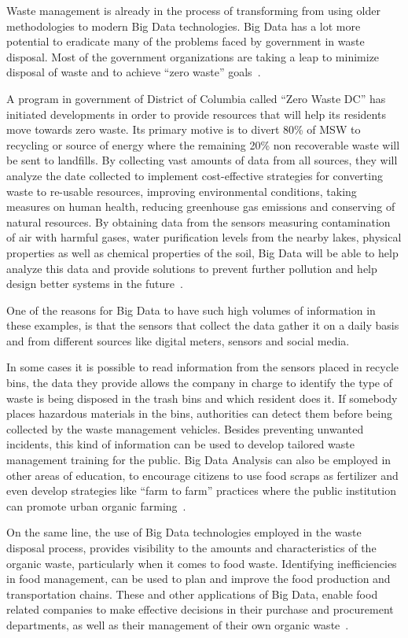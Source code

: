 Waste management is already in the process of transforming from using older 
methodologies to modern Big Data technologies. Big Data has a lot more 
potential to eradicate many of the problems faced by government in waste 
disposal. Most of the government organizations are taking a leap to minimize 
disposal of waste and to achieve ``zero waste'' goals~\cite{rosengren2017}. 

A program in government of District of Columbia called ``Zero Waste DC'' 
has initiated developments in order to provide resources that will help 
its residents move towards zero waste. Its primary motive is to divert 
80\% of MSW to recycling or source of energy where the remaining 20\% 
non recoverable waste will be sent to landfills. By collecting vast amounts 
of data from all sources, they will analyze  the date collected to implement 
cost-effective strategies for converting waste to re-usable resources, 
improving environmental conditions, taking measures on human health, 
reducing greenhouse gas emissions and conserving of natural resources. 
By obtaining data from the sensors measuring contamination of air with 
harmful gases, water purification levels from the nearby lakes, physical 
properties as well as chemical properties of the soil, Big Data will be 
able to help analyze this data and provide solutions to prevent further 
pollution and help design better systems in the future~\cite{rosengren2017}.

One of the reasons for Big Data to have such high volumes of information 
in these examples, is that the sensors that collect the data gather it on 
a daily basis and from different sources like digital meters, sensors and 
social media. 

In some cases it is possible to read information from the sensors placed in 
recycle bins, the data they provide allows the company in charge to identify 
the type of waste is being disposed in the trash bins and which resident does 
it. If somebody places hazardous materials in the bins, authorities can detect 
them before  being collected by the waste management vehicles. Besides 
preventing unwanted incidents, this kind of information can be used to 
develop tailored waste management training for the public. Big Data Analysis 
can also be employed in other areas of education, to encourage citizens to 
use food scraps as fertilizer and even develop strategies like 
``farm to farm'' practices where the public institution can promote 
urban organic farming~\cite{james2012}.

On the same line, the use of Big Data technologies employed in the  waste 
disposal process, provides visibility to the amounts and characteristics 
of the organic waste, particularly when it comes to food waste. 
Identifying inefficiencies in food management, can be used to plan and 
improve the food production and transportation chains. These and other 
applications of Big Data, enable food related companies to make effective 
decisions in their purchase and procurement departments, as well as their 
management of their own organic waste~\cite{frank2016}.

